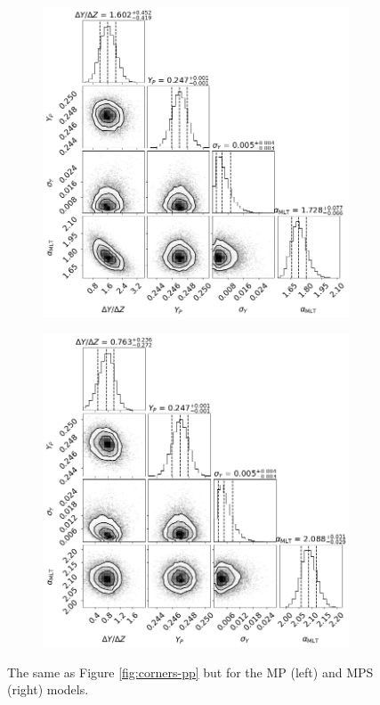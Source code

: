 \documentclass[fleqn,usenatbib]{mnras}
\begin{document}
\begin{figure}
    \begin{subfigure}[b]{.5\linewidth}
        \centering
        \includegraphics[width=\textwidth]{figures/corner_plot_mp.png}
    \end{subfigure}%
    \begin{subfigure}[b]{.5\linewidth}
        \centering
        \includegraphics[width=\textwidth]{figures/corner_plot_mps.png}
    \end{subfigure}
    \caption{The same as Figure \ref{fig:corners-pp} but for the MP (left) and MPS (right) models.}
    \label{fig:corners-mp}
\end{figure} 
\end{document}
